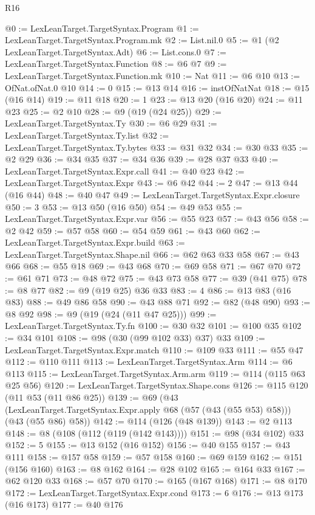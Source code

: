 \begin{lexlean}{R16}
\begin{coremodule}
{{{{{{{{{{{{{{{{{{{@0 := LexLeanTarget.TargetSyntax.Program
@1 := LexLeanTarget.TargetSyntax.Program.mk
@2 := List.nil.{0}
@5 := @1 (@2 LexLeanTarget.TargetSyntax.Adt)
@6 := List.cons.{0}
@7 := LexLeanTarget.TargetSyntax.Function
@8 := @6 @7
@9 := LexLeanTarget.TargetSyntax.Function.mk
@10 := Nat
@11 := @6 @10
@13 := OfNat.ofNat.{0} @10
@14 := 0
@15 := @13 @14
@16 := instOfNatNat
@18 := @15 (@16 @14)
@19 := @11 @18
@20 := 1
@23 := @13 @20 (@16 @20)
@24 := @11 @23
@25 := @2 @10
@28 := @9 (@19 (@24 @25))
@29 := LexLeanTarget.TargetSyntax.Ty
@30 := @6 @29
@31 := LexLeanTarget.TargetSyntax.Ty.list
@32 := LexLeanTarget.TargetSyntax.Ty.bytes
@33 := @31 @32
@34 := @30 @33
@35 := @2 @29
@36 := @34 @35
@37 := @34 @36
@39 := @28 @37 @33
@40 := LexLeanTarget.TargetSyntax.Expr.call
@41 := @40 @23
@42 := LexLeanTarget.TargetSyntax.Expr
@43 := @6 @42
@44 := 2
@47 := @13 @44 (@16 @44)
@48 := @40 @47
@49 := LexLeanTarget.TargetSyntax.Expr.closure
@50 := 3
@53 := @13 @50 (@16 @50)
@54 := @49 @53
@55 := LexLeanTarget.TargetSyntax.Expr.var
@56 := @55 @23
@57 := @43 @56
@58 := @2 @42
@59 := @57 @58
@60 := @54 @59
@61 := @43 @60
@62 := LexLeanTarget.TargetSyntax.Expr.build
@63 := LexLeanTarget.TargetSyntax.Shape.nil
@66 := @62 @63 @33 @58
@67 := @43 @66
@68 := @55 @18
@69 := @43 @68
@70 := @69 @58
@71 := @67 @70
@72 := @61 @71
@73 := @48 @72
@75 := @43 @73 @58
@77 := @39 (@41 @75)
@78 := @8 @77
@82 := @9 (@19 @25) @36 @33
@83 := 4
@86 := @13 @83 (@16 @83)
@88 := @49 @86 @58
@90 := @43 @88 @71
@92 := @82 (@48 @90)
@93 := @8 @92
@98 := @9 (@19 (@24 (@11 @47 @25)))
@99 := LexLeanTarget.TargetSyntax.Ty.fn
@100 := @30 @32
@101 := @100 @35
@102 := @34 @101
@108 := @98 (@30 (@99 @102 @33) @37) @33
@109 := LexLeanTarget.TargetSyntax.Expr.match
@110 := @109 @33
@111 := @55 @47
@112 := @110 @111
@113 := LexLeanTarget.TargetSyntax.Arm
@114 := @6 @113
@115 := LexLeanTarget.TargetSyntax.Arm.arm
@119 := @114 (@115 @63 @25 @56)
@120 := LexLeanTarget.TargetSyntax.Shape.cons
@126 := @115 @120 (@11 @53 (@11 @86 @25))
@139 := @69
    (@43 (LexLeanTarget.TargetSyntax.Expr.apply @68 (@57 (@43 (@55 @53) @58))) (@43 (@55 @86) @58))
@142 := @114 (@126 (@48 @139))
@143 := @2 @113
@148 := @8 (@108 (@112 (@119 (@142 @143))))
@151 := @98 (@34 @102) @33
@152 := 5
@155 := @13 @152 (@16 @152)
@156 := @40 @155
@157 := @43 @111
@158 := @157 @58
@159 := @57 @158
@160 := @69 @159
@162 := @151 (@156 @160)
@163 := @8 @162
@164 := @28 @102
@165 := @164 @33
@167 := @62 @120 @33
@168 := @57 @70
@170 := @165 (@167 @168)
@171 := @8 @170
@172 := LexLeanTarget.TargetSyntax.Expr.cond
@173 := 6
@176 := @13 @173 (@16 @173)
@177 := @40 @176
}}}}}}}}}}}}}}}}}}}
\end{coremodule}
\end{lexlean}
